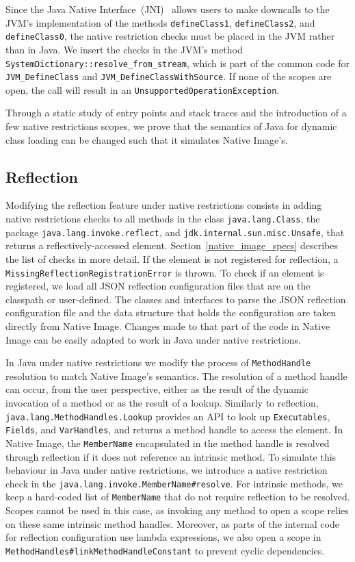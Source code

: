 Since the Java Native Interface~(JNI)~\cite{noauthor_jni_nodate} allows users to make downcalls to the JVM's implementation of the methods \verb|defineClass1|, \verb|defineClass2|, and \verb|defineClass0|, the native restriction checks must be placed in the JVM rather than in Java. We insert the checks in the JVM's method \verb|SystemDictionary::resolve_from_stream|, which is part of the common code for \verb|JVM_DefineClass| and \verb|JVM_DefineClassWithSource|. If none of the scopes are open, the call will result in an \verb|UnsupportedOperationException|. 

Through a static study of entry points and stack traces and the introduction of a few native restrictions scopes, we prove that the semantics of Java for dynamic class loading can be changed such that it simulates Native Image's.

\subsection{Reflection}
Modifying the reflection feature under native restrictions consists in adding native restrictions checks to all methods in the class \verb|java.lang.Class|, the package \verb|java.lang.invoke.reflect|, and \verb|jdk.internal.sun.misc.Unsafe|, that returns a reflectively-accessed element. Section~\ref{native_image_specs} describes the list of checks in more detail. 
If the element is not registered for reflection, a \verb|MissingReflectionRegistrationError| is thrown.
To check if an element is registered, we load all JSON reflection configuration files that are on the classpath or user-defined. The classes and interfaces to parse the JSON reflection configuration file and the data structure that holds the configuration are taken directly from Native Image. Changes made to that part of the code in Native Image can be easily adapted to work in Java under native restrictions.

In Java under native restrictions we modify the process of \verb|MethodHandle| resolution to match Native Image's semantics.
The resolution of a method handle can occur, from the user perspective, either as the result of the dynamic invocation of a method or as the result of a lookup.
Similarly to reflection, \verb|java.lang.MethodHandles.Lookup| provides an API to look up \verb|Executables|, \verb|Fields|, and \verb|VarHandles|, and returns a method handle to access the element. 
In Native Image, the \verb|MemberName| encapsulated in the method handle is resolved through reflection if it does not reference an intrinsic method. To simulate this behaviour in Java under native restrictions, we introduce a native restriction check in the \verb|java.lang.invoke.MemberName#resolve|. 
For intrinsic methods, we keep a hard-coded list of \verb|MemberName| that do not require reflection to be resolved. Scopes cannot be used in this case, as invoking any method to open a scope relies on these same intrinsic method handles.
Moreover, as parts of the internal code for reflection configuration use lambda expressions, we also open a scope in \verb|MethodHandles#linkMethodHandleConstant| to prevent cyclic dependencies.

